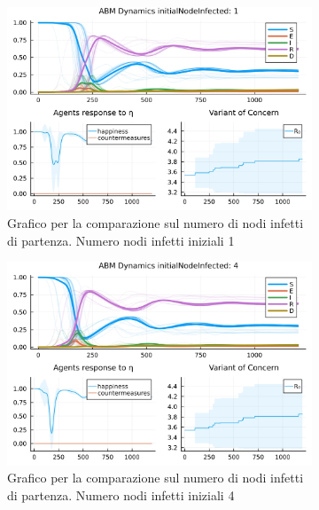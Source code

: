 \begin{figure}[H]
	\centering
	\begin{subfigure}[b]{0.45\textwidth}
		\centering
		\includegraphics[width=\textwidth]{img/SocialNetworkABM_1_II.jpg}
		\caption{Grafico per la comparazione sul numero di nodi infetti di partenza. Numero nodi infetti iniziali 1}
		\label{fig:comparison_init_node_inf_1}
	\end{subfigure}
	\hfill
	\begin{subfigure}[b]{0.45\textwidth}
		\centering
		\includegraphics[width=\textwidth]{img/SocialNetworkABM_2_II.jpg}
		\caption{Grafico per la comparazione sul numero di nodi infetti di partenza. Numero nodi infetti iniziali 4}
		\label{fig:comparison_init_node_inf_4}
	\end{subfigure}
	\hfill
	\begin{subfigure}[b]{0.45\textwidth}
		\centering

\end{subfigure}
\end{figure}

